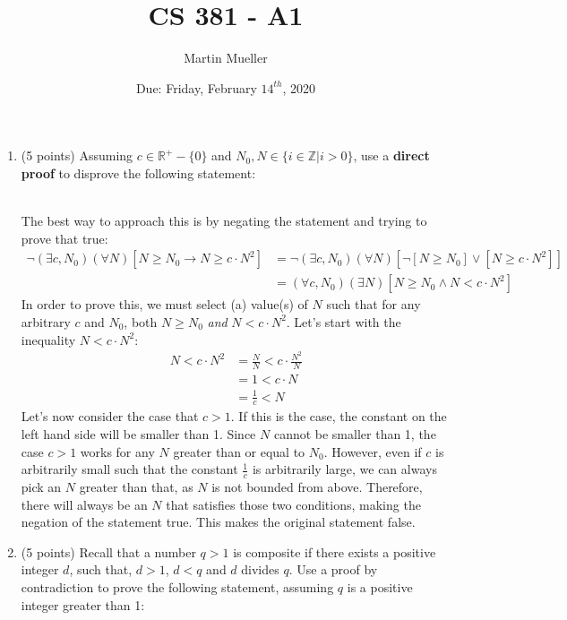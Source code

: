 \documentclass[12pt, letter]{article}
\title{CS 381 - A1}
\author{Martin Mueller}
\date{Due: Friday, February $14^{th}$, 2020}
\begin{document}
	\maketitle
	\begin{enumerate}
		\item (5 points) Assuming $c \in \mathbb{R}^{+} - \{0\}$ and $N_{0}, N \in \{i \in \mathbb{Z} | i > 0\}$, use a \textbf{direct proof} to disprove the following statement: \\ \\
		\noindent{}
		\begin{center}
			The best way to approach this is by negating the statement and trying to prove that true:
			\begin{align*}
				\neg(\exists c, N_{0})(\forall N)[N \ge N_{0} \to N \ge c \cdot N^{2}] &= \neg(\exists c, N_{0})(\forall N)[\neg[N \ge N_{0}] \vee [N \ge c \cdot N^{2}]] \\
				&= (\forall c, N_{0})(\exists N)[N \ge N_{0} \wedge N < c \cdot N^{2}]
			\end{align*}
			In order to prove this, we must select (a) value(s) of $N$ such that for any arbitrary $c$ and $N_{0}$, both $N \ge N_{0}$ \textit{and} $N < c \cdot N^{2}$. Let's start with the inequality $N < c \cdot N^{2}$:
			\begin{align*}
				N < c \cdot N^{2} &= \frac{N}{N} < c \cdot \frac{N^{2}}{N} \\
				&= 1 < c \cdot N \\
				&= \frac{1}{c} < N
			\end{align*}
			Let's now consider the case that $c > 1$. If this is the case, the constant on the left hand side will be smaller than 1. Since $N$ cannot be smaller than 1, the case $c > 1$ works for any $N$ greater than or equal to $N_{0}$. However, even if $c$ is arbitrarily small such that the constant $\frac{1}{c}$ is arbitrarily large, we can always pick an $N$ greater than that, as $N$ is not bounded from above. Therefore, there will always be an $N$ that satisfies those two conditions, making the negation of the statement true. This makes the original statement false.
		\end{center}
		\item (5 points) Recall that a number $q > 1$ is composite if there exists a positive integer $d$, such that, $d > 1$, $d < q$ and $d$ divides $q$. Use a proof by contradiction to prove the following statement, assuming $q$ is a positive integer greater than 1: \\ \\

\end{enumerate}
\end{document}
